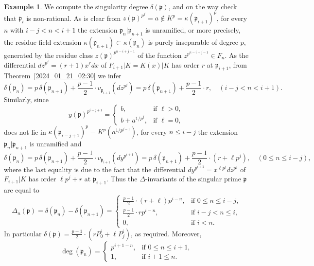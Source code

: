\documentclass[12pt,reqno]{amsart}%
\theoremstyle{definition}
\newtheorem{example}[prop]{Example}
\theoremstyle{remark}
\newcommand{\su}{\subset}
\newcommand{\pp}{\mathfrak{p}}
\newcommand{\de}{\delta}
\newcommand{\De}{\Delta}
\newcommand{\ka}{\kappa}
\begin{document}
\begin{example}
We compute the singularity degree $\de(\pp)$, and on the way check that $\pp_i$ is non-rational.
As is clear from $z(\pp)^{p^j} = a \notin K^p=\ka(\pp_{i+1})^p$, for every $n$ with $i-j < n < i+1$ the extension $\pp_n|\pp_{n+1}$ is unramified, or more precisely, the residue field extension $\ka({\pp_{n+1}}) \su \ka({\pp_n})$ is purely inseparable of degree $p$, generated by the residue class $z(\pp)^{p^{n-i+j-1}}$ of the function $z^{p^{n-i+j-1}} \in F_n$.
As the differential $dz^{p^{j}} = (r+1) x^r dx$ of $F_{i+1}|K = K(x)|K$ has order $r$ at $\pp_{i+1}$, from Theorem~\ref{2024_01_21_02:30} we infer
\[ \de(\pp_n) = p \, \de(\pp_{n+1}) + \frac{p-1}2 \cdot v_{\pp_{i+1}} (dz^{p^j}) = p \, \de(\pp_{n+1}) + \frac{p-1}2 \cdot r, \quad (i-j < n < i+1). \]
Similarly, since
\[ y(\pp)^{p^{i-j+1}} = 
\begin{cases} 
    b, & \text{if $\ell>0$},  \\
    b + a^{1/p^j}, & \text{if $\ell=0$},
\end{cases} \]
does not lie in $\ka({\pp_{i-j+1}})^p = K^p(a^{1 / p^{j-1}})$, for every $n\leq i-j$ the extension $\pp_n|\pp_{n+1}$ is unramified and
\[ \de(\pp_n) = p \, \de(\pp_{n+1}) + \frac{p-1}2 \cdot v_{\pp_{i+1}} (dy^{p^{i+1}}) = p\, \de(\pp_{n+1}) + \frac{p-1}2 \cdot (r + \ell p^{j}), \quad (0\leq n \leq i-j), \]
where the last equality is due to the fact that the differential $dy^{p^{i+1}} = x^{\ell p^j}dz^{p^j}$ of $F_{i+1}|K$ has order $\ell p^j + r$ at $\pp_{i+1}$.
Thus the $\De$-invariants of the singular prime $\pp$ are equal to
\[ \De_n(\pp) = \de(\pp_n) - \de(\pp_{n+1}) =
\begin{cases}
    \frac{p-1}2 \cdot (r + \ell) p^{i-n}, & \text{if $0\leq n \leq i-j$,} \\
    \frac{p-1}2 \cdot r p^{i-n}, & \text{if $i-j < n \leq i$,} \\
    0, & \text{if $i<n$.}
\end{cases}
\]
In particular $\de(\pp) =  \frac{p-1}2 \cdot ( r P_0^i + \ell P_j^{i} )$, as required.
Moreover,
\[ \deg(\pp_n) = 
\begin{cases}
    p^{i+1-n}, & \text{if $0\leq n \leq i+1$,} \\
    1, & \text {if $i+1 \leq n$.}
\end{cases}
\]

\end{example}
\end{document}
